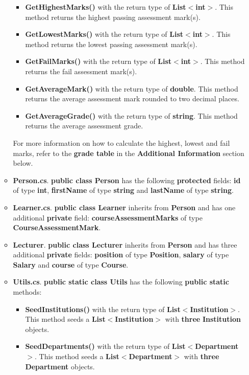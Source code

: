 \documentclass{article}
\begin{document}
\begin{itemize}
\begin{itemize}
\begin{itemize}
            \item \textbf{GetHighestMarks()} with the return type of \textbf{List$<$int$>$}. This method returns the highest passing assessment mark(s).
            \item \textbf{GetLowestMarks()} with the return type of \textbf{List$<$int$>$}. This method returns the lowest passing assessment mark(s). 
            \item \textbf{GetFailMarks()} with the return type of \textbf{List$<$int$>$}. This method returns the fail assessment mark(s).
            \item \textbf{GetAverageMark()} with the return type of \textbf{double}. This method returns the average assessment mark rounded to two decimal places.
            \item \textbf{GetAverageGrade()} with the return type of \textbf{string}. This method returns the average assessment grade.
        \end{itemize}
        For more information on how to calculate the highest, lowest and fail marks, refer to the \textbf{grade table} in the \textbf{Additional Information} section below.
        \item \textbf{Person.cs}. \textbf{public class Person} has the following \textbf{protected} fields: \textbf{id} of type \textbf{int}, \textbf{firstName} of type \textbf{string} and \textbf{lastName} of type \textbf{string}.
        \item \textbf{Learner.cs}. \textbf{public class Learner} inherits from \textbf{Person} and has one additional \textbf{private} field: \textbf{courseAssessmentMarks} of type \textbf{CourseAssessmentMark}.
        \item \textbf{Lecturer}. \textbf{public class Lecturer} inherits from \textbf{Person} and has three additional \textbf{private} fields: \textbf{position} of type \textbf{Position}, \textbf{salary} of type \textbf{Salary} and \textbf{course} of type \textbf{Course}.
        \item \textbf{Utils.cs}. \textbf{public static class Utils} has the following \textbf{public static} methods:
        \begin{itemize}
            \item \textbf{SeedInstitutions()} with the return type of \textbf{List$<$Institution$>$}. This method seeds a \textbf{List$<$Institution$>$} with \textbf{three} \textbf{Institution} objects.
            \item \textbf{SeedDepartments()} with the return type of \textbf{List$<$Department$>$}. This method seeds a \textbf{List$<$Department$>$} with \textbf{three} \textbf{Department} objects.

\end{itemize}
\end{itemize}
\end{itemize}
\end{document}
